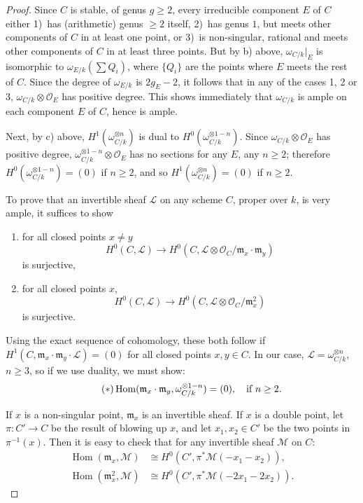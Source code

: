 \documentclass[10pt]{amsart}
\theoremstyle{plain}
\theoremstyle{definition}
\DeclareMathOperator{\Hom}{Hom}
\newcommand{\cO}{\mathcal{O}}
\newcommand{\m}{\mathfrak{m}}
\begin{document}
\begin{proof}
Since $C$ is stable, of genus $g \geq 2$, every irreducible component $E$ of $C$ either 1)~has (arithmetic) genus $\geq 2$ itself, 2)~has genus $1$, but meets other components of $C$ in at least one point, or 3)~is non-singular, rational and meets other components of $C$ in at least three points. But by b) above, $\omega_{C/k}|_E$ is isomorphic to $\omega_{E/k}(\sum Q_i)$, where $\{Q_i\}$ are the points where $E$ meets the rest of $C$. Since the degree of $\omega_{E/k}$ is $2g_E - 2$, it follows that in any of the cases 1, 2 or 3, $\omega_{C/k} \otimes \cO_E$ has positive degree. This shows immediately that $\omega_{C/k}$ is ample on each component $E$ of $C$, hence is ample.

Next, by c) above, $H^1(\omega_{C/k}^{\otimes n})$ is dual to $H^0(\omega_{C/k}^{\otimes 1-n})$. Since $\omega_{C/k} \otimes \cO_E$ has positive degree, $\omega_{C/k}^{\otimes 1-n} \otimes \cO_E$ has no sections for any $E$, any $n \geq 2$; therefore $H^0(\omega_{C/k}^{\otimes 1-n}) = (0)$ if $n \geq 2$, and so $H^1(\omega_{C/k}^{\otimes n}) = (0)$ if $n \geq 2$.

To prove that an invertible sheaf $\mathscr{L}$ on any scheme $C$, proper over $k$, is very ample, it suffices to show
\begin{enumerate}
\item[a)] for all closed points $x \neq y$
\[
H^0(C, \mathscr{L}) \longrightarrow H^0(C, \mathscr{L} \otimes \cO_C/\m_x \cdot \m_y)
\]
is surjective,
\item[b)] for all closed points $x$,
\[
H^0(C, \mathscr{L}) \longrightarrow H^0(C, \mathscr{L} \otimes \cO_C/\m_x^2)
\]
is surjective.
\end{enumerate}
Using the exact sequence of cohomology, these both follow if $H^1(C, \m_x \cdot \m_y \cdot \mathscr{L}) = (0)$ for all closed points $x, y \in C$. In our case, $\mathscr{L} = \omega_{C/k}^{\otimes n}$, $n \geq 3$, so if we use duality, we must show:
\begin{equation}\tag{${*}$}\label{eq:star}
\Hom(\m_x \cdot \m_y, \omega_{C/k}^{\otimes 1-n}) = (0), \quad \text{if } n \geq 2.
\end{equation}

If $x$ is a non-singular point, $\m_x$ is an invertible sheaf. If $x$ is a double point, let $\pi: C' \to C$ be the result of blowing up $x$, and let $x_1, x_2 \in C'$ be the two points in $\pi^{-1}(x)$. Then it is easy to check that for any invertible sheaf $\mathscr{M}$ on $C$:
\begin{align*}
\Hom(\m_x, \mathscr{M}) &\cong H^0(C', \pi^*\mathscr{M}(-x_1-x_2)), \\
\Hom(\m_x^2, \mathscr{M}) &\cong H^0(C', \pi^*\mathscr{M}(-2x_1-2x_2)).
\end{align*}


\end{proof}
\end{document}

